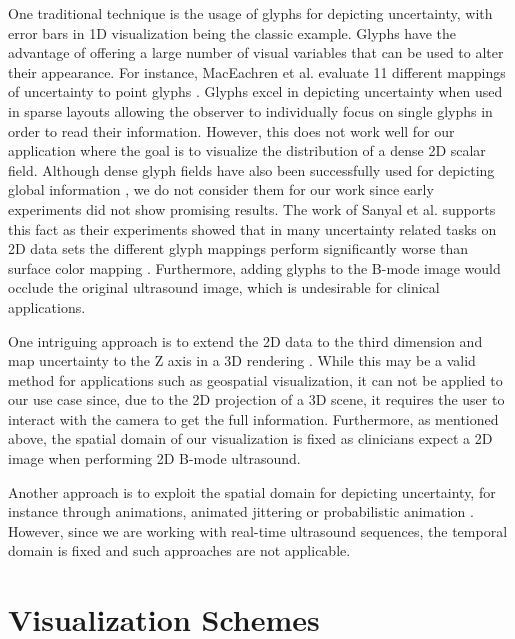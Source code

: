 One traditional technique is the usage of glyphs for depicting uncertainty, with error bars in 1D visualization being the classic example.
Glyphs have the advantage of offering a large number of visual variables that can be used to alter their appearance.
For instance, MacEachren et al. evaluate 11 different mappings of uncertainty to point glyphs \cite{MacEachren:2012:VisualSemiotics}.
Glyphs excel in depicting uncertainty when used in sparse layouts allowing the observer to individually focus on single glyphs in order to read their information.
However, this does not work well for our application where the goal is to visualize the distribution of a dense 2D scalar field.
Although dense glyph fields have also been successfully used for depicting global information \cite{Kindlman:2006:GlyphPacking, Borgo:2012:GlyphVisualization}, we do not consider them for our work since early experiments did not show promising results.
The work of Sanyal et al. supports this fact as their experiments showed that in many uncertainty related tasks on 2D data sets the different glyph mappings perform significantly worse than surface color mapping \cite{Sanyal:2009:UncertaintyVis}.
Furthermore, adding glyphs to the B-mode image would occlude the original ultrasound image, which is undesirable for clinical applications.

One intriguing approach is to extend the 2D data to the third dimension and map uncertainty to the Z axis in a 3D rendering \cite{Brown:2004:VibrationVis, Kao:2001:Eosvis}.
While this may be a valid method for applications such as geospatial visualization, it can not be applied to our use case since, due to the 2D projection of a 3D scene, it requires the user to interact with the camera to get the full information.
Furthermore, as mentioned above, the spatial domain of our visualization is fixed as clinicians expect a 2D image when performing 2D B-mode ultrasound.

Another approach is to exploit the spatial domain for depicting uncertainty, for instance through animations, animated jittering or probabilistic animation \cite{Brown:2004:VibrationVis, Lundstrom:2007:Animation}.
However, since we are working with real-time ultrasound sequences, the temporal domain is fixed and such approaches are not applicable.


\section{Visualization Schemes}
\label{sec:cmvis:mapping-schemes}

